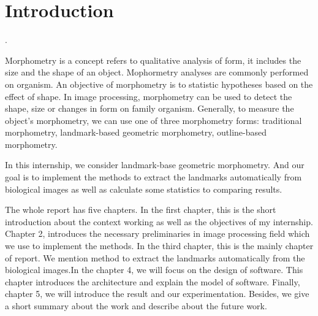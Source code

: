 \chapter*{Introduction}.

Morphometry is a concept refers to qualitative analysis of form, it includes the size and the shape of an object. Mophormetry analyses are commonly performed on organism. An objective of morphometry is to statistic hypotheses based on the effect of shape.
In image processing, morphometry can be used to detect the shape, size or changes in form on family organism. Generally, to measure the object's morphometry, we can use one of three morphometry forms: traditional morphometry, landmark-based geometric morphometry, outline-based morphometry.  

In this internship, we consider landmark-base geometric morphometry. And our goal is to implement the methods to extract the landmarks automatically from biological images as well as calculate some statistics to comparing results.

The whole report has five chapters. In the first chapter, this is the short introduction about the context working as well as the objectives of my internship. Chapter 2, introduces the necessary preliminaries in image processing field which we use to implement the methods. In the third chapter, this is the mainly chapter of report. We mention method to extract the landmarks automatically from the biological images.In the chapter 4, we will focus on the design of software. This chapter introduces the architecture and explain the model of software. Finally, chapter 5, we will introduce the result and our experimentation. Besides, we give a short summary about the work and describe about the future work.